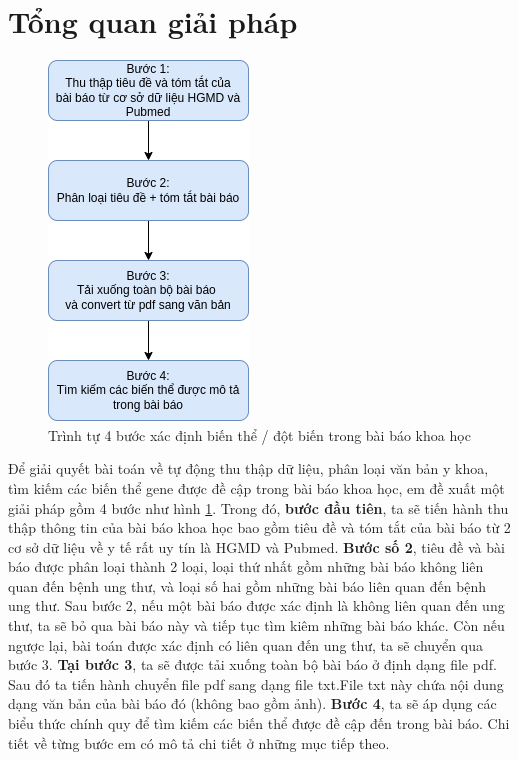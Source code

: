 \documentclass[../DoAn.tex]{subfiles}
\begin{document}
\section{Tổng quan giải pháp}
\begin{figure}
\centering
\includegraphics[width=0.6\linewidth]{Hinh_ve/soDoTongQuan_DATN.png}
\caption{Trình tự 4 bước xác định biến thể / đột biến trong bài báo khoa học}
\label{fig:3trinhtu4buoc}
\end{figure}

Để giải quyết bài toán về tự động thu thập dữ liệu, phân loại văn bản y khoa, tìm kiếm các biến thể gene được đề cập trong bài báo khoa học, em đề xuất một giải pháp gồm 4 bước như hình \ref{fig:3trinhtu4buoc}. Trong đó, \textbf{bước đầu tiên}, ta sẽ tiến hành thu thập thông tin của bài báo khoa học bao gồm tiêu đề và tóm tắt của bài báo từ 2 cơ sở dữ liệu về y tế rất uy tín là HGMD và Pubmed. \textbf{Bước số 2}, tiêu đề và bài báo được phân loại thành 2 loại, loại thứ nhất gồm những bài báo không liên quan đến bệnh ung thư, và loại số hai gồm những bài báo liên quan đến bệnh ung thư. Sau bước 2, nếu một bài báo được xác định là không liên quan đến ung thư, ta sẽ bỏ qua bài báo này và tiếp tục tìm kiêm những bài báo khác. Còn nếu ngược lại, bài toán được xác định có liên quan đến ung thư, ta sẽ chuyển qua bước 3. \textbf{Tại bước 3}, ta sẽ được tải xuống toàn bộ bài báo ở định dạng file pdf. Sau đó ta tiến hành chuyển file pdf sang dạng file txt.File txt này chứa nội dung dạng văn bản của bài báo đó (không bao gồm ảnh). \textbf{Bước 4}, ta sẽ áp dụng các biểu thức chính quy để tìm kiếm các biến thể được đề cập đến trong bài báo. Chi tiết về từng bước em có mô tả chi tiết ở những mục tiếp theo.
\end{document}
